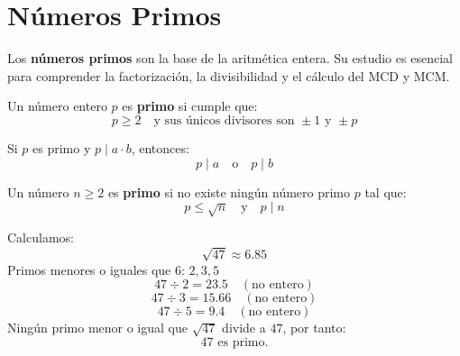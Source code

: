 \documentclass[a4paper,12pt]{article}
\begin{document}

\section{Números Primos}

Los \textbf{números primos} son la base de la aritmética entera.  
Su estudio es esencial para comprender la factorización, la divisibilidad y el cálculo del MCD y MCM.


\begin{procedimiento}[title={Definición de número primo}]
Un número entero \( p \) es \textbf{primo} si cumple que:
\[
p \geq 2 \quad \text{y sus únicos divisores son } \pm 1 \text{ y } \pm p
\]
\end{procedimiento}

\begin{procedimiento}[title={Propiedad fundamental de los números primos}]
Si \( p \) es primo y \( p \mid a \cdot b \), entonces:
\[
p \mid a \quad \text{o} \quad p \mid b
\]
\end{procedimiento}


\begin{procedimiento}[title={Cómo comprobar si un número es primo}]
Un número \( n \geq 2 \) es \textbf{primo} si no existe ningún número primo \( p \) tal que:
\[
p \leq \sqrt{n} \quad \text{y} \quad p \mid n
\]
\end{procedimiento}

\begin{ejemplo}[title={Ejemplo: comprobar si \(47\) es primo}]
Calculamos:
\[
\sqrt{47} \approx 6.85
\]
Primos menores o iguales que \(6\): \(2, 3, 5\)
\[
47 \div 2 = 23.5 \quad (\text{no entero})
\]
\[
47 \div 3 = 15.66 \quad (\text{no entero})
\]
\[
47 \div 5 = 9.4 \quad (\text{no entero})
\]
Ningún primo menor o igual que \(\sqrt{47}\) divide a \(47\), por tanto:
\[
\boxed{47 \text{ es primo.}}
\]
\end{ejemplo}

\end{document}
